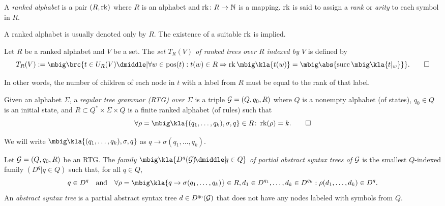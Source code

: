 \begin{definition}
 A \emph{ranked alphabet} is a pair $(R,\operatorname{rk})$ where $R$ is an alphabet and
 $\operatorname{rk}\colon R\to\mathbb N$ is a mapping. $\operatorname{rk}$ is said to assign a \emph{rank} or
 \emph{arity} to each symbol in $R$.
\end{definition}

A ranked alphabet is usually denoted only by $R$. The existence of a suitable
$\operatorname{rk}$ is implied.

\begin{definition}
 Let $R$ be a ranked alphabet and $V$ be a set. The \emph{set $T_R(V)$ of
 ranked trees over $R$ indexed by $V$} is defined by
 \[
  T_R(V) := \mbig\brc{t \in U_R(V) \dmiddle| \forall w\in\pos(t): t(w)\in R\Rightarrow \rk\mbig\kla{t(w)} = \mbig\abs{\osucc\mbig\kla{t|_w}}}.
  \qedhere
 \]
\end{definition}

In other words, the number of children of each node in $t$ with a label from
$R$ must be equal to the rank of that label.

\begin{definition}
 Given an alphabet $\Sigma$, a \emph{regular tree grammar (RTG) over $\Sigma$}
 is a triple $\mathcal G = (Q,q_0,R)$ where $Q$ is a nonempty alphabet (of states),
 $q_0\in Q$ is an initial state, and $R\subset Q^*\times\Sigma\times Q$ is a
 finite ranked alphabet (of rules) such that
 \[
  \forall \rho = \mbig\kla{(q_1,\ldots,q_k),\sigma,q}\in R\colon \rk(\rho) = k.
  \qedhere
 \]
\end{definition}

We will write $\mbig\kla{(q_1,\ldots,q_k),\sigma,q}$ as $q\to\sigma(q_1,\ldots,q_k)$.

\begin{definition}\label{def:02-past}
 Let $\mathcal G=(Q,q_0,R)$ be an RTG. The \emph{family
 $\mbig\kla{D^q(\ug)\!\dmiddle|\!q\in Q}$ of partial abstract syntax trees of
 $\mathcal G$} is the smallest $Q$-indexed family $(D^q|q\in Q)$ such that, for all
 $q\in Q$,
 \[
  q \in D^q \quad\text{and}\quad \forall \rho=\mbig\kla{q\to\sigma(q_1,\ldots,q_k)}\in R,d_1\in D^{q_1},\ldots,d_k\in D^{q_k}: \rho(d_1,\ldots,d_k) \in D^q.
 \]
 An \emph{abstract syntax tree} is a partial abstract syntax tree $d\in
 D^{q_0}(\mathcal G)$ that does not have any nodes labeled with symbols from $Q$.
\end{definition}

